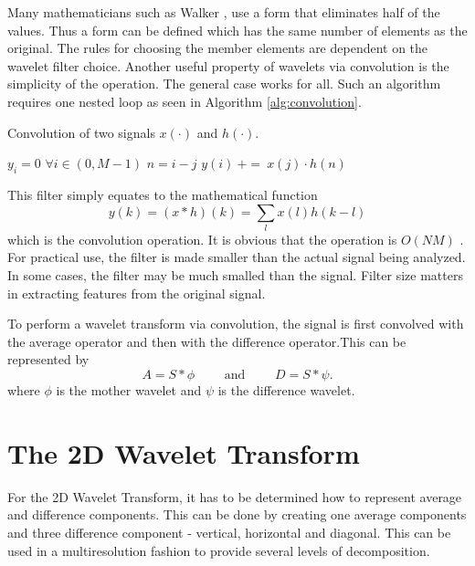 Many mathematicians such as Walker \cite{walker}, use a form that
eliminates half of the values. Thus a form can be defined which has
the same number of elements as the original.  The rules for choosing
the member elements are dependent on the wavelet filter choice. 
Another useful property of wavelets via convolution is the simplicity
of the operation. The general case works for all.  Such an algorithm
requires one nested loop as seen in Algorithm \ref{alg:convolution}.

\begin{algorithm}
\caption{Convolution of two signals $x(\cdot)$ and $h(\cdot)$.}
\label{alg:convolution}
\begin{algorithmic}
\STATE $y_i = 0$ $\forall i \in (0,M-1)$
\STATE $n=i-j$
\STATE$y(i) \  += \ x(j)\cdot h(n)$
\ENDIF
\ENDFOR
\ENDFOR
\end{algorithmic}
\end{algorithm}

This filter simply equates to the mathematical function
\[
y(k) = (x\ast h)(k) = \sum_{l}x(l)h(k-l)
\]
which is the convolution operation. It is obvious
that the operation is $O(NM)$ . For practical
use, the filter is made smaller than the actual signal being
analyzed. In some cases, the filter may be much smalled than the
signal. Filter size matters in extracting features from the original
signal.

To perform a wavelet transform via convolution, the signal is first
convolved with the average operator and then with the difference
operator.This can be represented by
\[
A = S \ast \phi 
\qquad \mbox{ and } \qquad
D = S \ast \psi.
\]
where $\phi$ is the mother wavelet and $\psi$ is the difference wavelet.

\section{The 2D Wavelet Transform} \label{sec:2Dwavelet}

For the 2D Wavelet Transform, it has to be determined how to represent
average and difference components. This can be done by creating one
average components and three difference component - vertical,
horizontal and diagonal. This can be used in a multiresolution fashion
to provide several levels of decomposition. 

